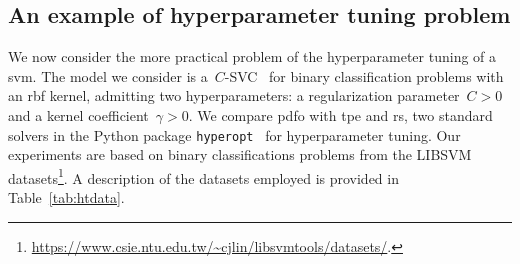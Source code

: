 \documentclass[
    smallextended,  %
    final,        %
]{svjour3}
\begin{document}




\subsection{An example of hyperparameter tuning problem}
\label{ssec:hypertune}

We now consider the more practical problem of the hyperparameter tuning of a \gls{svm}.
The model we consider is a~$C$-SVC~\cite{Chang_Lin_2011} for binary classification problems with an \gls{rbf} kernel, admitting two hyperparameters: a regularization parameter~$C > 0$ and a kernel coefficient~$\gamma > 0$.
We compare \gls{pdfo} with \gls{tpe} and \gls{rs}, two standard solvers
in the Python package \texttt{hyperopt}~\cite{Bergstra_Yamins_Cox_2013} for hyperparameter tuning.
Our experiments are based on binary classifications problems from the LIBSVM datasets\footnote{\url{https://www.csie.ntu.edu.tw/~cjlin/libsvmtools/datasets/}.}.
A description of the datasets employed is provided in Table~\ref{tab:htdata}.
\end{document}
